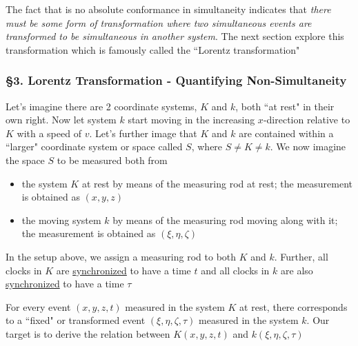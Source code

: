 The fact that is no absolute conformance in simultaneity indicates that \textit{there must be some form of
transformation where two simultaneous events are transformed to be simultaneous in another system}. The next section
explore this transformation which is famously called the ``Lorentz transformation"

\subsubsection{\hfil \S3. Lorentz Transformation - Quantifying Non-Simultaneity \hfil}

\begin{tcolorbox}[
    breakable,
    enhanced,
    arc=3mm,
    boxrule=1.5mm,
    boxsep=1.5mm,
    colback=yellow!20!white,
    colframe=blue,
    borderline={1mm}{1mm}{white},
    borderline={1mm}{2mm}{red}
]
    Let's imagine there are 2 coordinate systems, $K$ and $k$, both ``at rest" in their own right. Now let system $k$
    start moving in the increasing $x$-direction relative to $K$ with a speed of $v$. Let's further image that $K$ and
    $k$ are contained within a ``larger" coordinate system or space called $S$, where $S \ne K \ne k$. We now imagine
    the space $S$ to be measured both from

    \begin{itemize}
        \item the system $K$ at rest by means of the measuring rod at rest; the measurement is obtained as $(x, y, z)$
        \item the moving system $k$ by means of the measuring rod moving along with it; the measurement is obtained as
        $(\xi, \eta, \zeta)$
    \end{itemize}

    In the setup above, we assign a measuring rod to both $K$ and $k$. Further, all clocks in $K$ are
    \hyperref[def:synchronism]{synchronized} to have a time $t$ and all clocks in $k$ are also
    \hyperref[def:synchronism]{synchronized} to have a time $\tau$

    For every event $(x, y, z, t)$ measured in the system $K$ at rest, there corresponds to a ``fixed" or transformed
    event $(\xi, \eta, \zeta, \tau)$ measured in the system $k$. Our target is to derive the relation between
    $K(x, y, z, t)$ and $k(\xi, \eta, \zeta, \tau)$
\end{tcolorbox}







